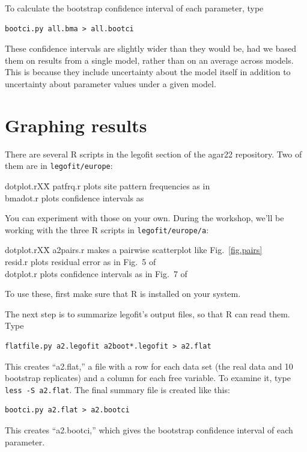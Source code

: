 \documentclass[11pt]{article}
\newenvironment{leftindent}%
{\begin{list}{}%
         {\setlength{\leftmargin}{2em}}%
         \item[]%
}{\end{list}}
\begin{document}
To calculate the bootstrap confidence interval of each parameter, type
\begin{verbatim}
bootci.py all.bma > all.bootci
\end{verbatim}
These confidence intervals are slightly wider than they would be, had
we based them on results from a single model, rather than on an
average across models. This is because they include uncertainty about
the model itself in addition to uncertainty about parameter values
under a given model.

\section{Graphing results}
\label{sec.graph}
There are several R scripts in the legofit section of the agar22
repository. Two of them are in \texttt{legofit/europe}:
\begin{leftindent}
\begin{tabbing}
  dotplot.rXX\=\kill
patfrq.r \> plots site pattern frequencies as in
    \citet[Fig.~3]{Rogers:arXiv-2201.02668}\\ 
bmadot.r \> plots confidence intervals as 
  \citet[Fig.~7]{Rogers:PCJ-2-e32}
\end{tabbing}
\end{leftindent}
You can experiment with those on your own. During the workshop, we'll
be working with the three R scripts in \texttt{legofit/europe/a}:
\begin{leftindent}
\begin{tabbing}
  dotplot.rXX\=\kill
a2pairs.r \> makes a pairwise scatterplot like
  Fig.~\ref{fig.pairs}\\
resid.r \> plots residual error as in Fig.~5 of \citep{Rogers:PCJ-2-e32}\\
dotplot.r \> plots confidence intervals as in Fig.~7 of
  \citep{Rogers:PCJ-2-e32}
\end{tabbing}
\end{leftindent}
To use these, first make sure that R is installed on your system.

The next step is to summarize legofit's output files, so that R can
read them. Type
\begin{verbatim}
flatfile.py a2.legofit a2boot*.legofit > a2.flat
\end{verbatim}
This creates ``a2.flat,'' a file with a row for each data set (the
real data and 10 bootstrap replicates) and a column for each free
variable. To examine it, type \texttt{less -S a2.flat}. The final
summary file is created like this:
\begin{verbatim}
bootci.py a2.flat > a2.bootci
\end{verbatim}
This creates ``a2.bootci,'' which gives the bootstrap confidence
interval of each parameter.
\end{document}
